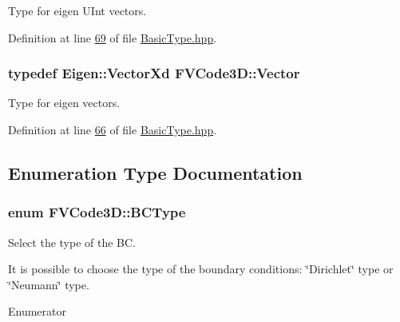 Type for eigen U\+Int vectors. 



Definition at line \hyperlink{BasicType_8hpp_source_l00069}{69} of file \hyperlink{BasicType_8hpp_source}{Basic\+Type.\+hpp}.

\subsubsection[{\texorpdfstring{Vector}{Vector}}]{\setlength{\rightskip}{0pt plus 5cm}typedef Eigen\+::\+Vector\+Xd {\bf F\+V\+Code3\+D\+::\+Vector}}\hypertarget{namespaceFVCode3D_a16ccf345652402bccd1a5d2e6782526c}{}\label{namespaceFVCode3D_a16ccf345652402bccd1a5d2e6782526c}


Type for eigen vectors. 



Definition at line \hyperlink{BasicType_8hpp_source_l00066}{66} of file \hyperlink{BasicType_8hpp_source}{Basic\+Type.\+hpp}.



\subsection{Enumeration Type Documentation}
\subsubsection[{\texorpdfstring{B\+C\+Type}{BCType}}]{\setlength{\rightskip}{0pt plus 5cm}enum {\bf F\+V\+Code3\+D\+::\+B\+C\+Type}}\hypertarget{namespaceFVCode3D_a73660061f11f1671164ce171a053f8c5}{}\label{namespaceFVCode3D_a73660061f11f1671164ce171a053f8c5}


Select the type of the BC. 

It is possible to choose the type of the boundary conditions\+: \char`\"{}\+Dirichlet\char`\"{} type or \char`\"{}\+Neumann\char`\"{} type. \begin{Desc}
\item[Enumerator]\par
\begin{description}
\item[{\em 
Dirichlet\hypertarget{namespaceFVCode3D_a73660061f11f1671164ce171a053f8c5a192024697bdaa4fbbb39b8961b747bce}{}\label{namespaceFVCode3D_a73660061f11f1671164ce171a053f8c5a192024697bdaa4fbbb39b8961b747bce}
}]\item[{\em 
Neumann\hypertarget{namespaceFVCode3D_a73660061f11f1671164ce171a053f8c5a30212425b27314b01b40f4984dbf850a}{}\label{namespaceFVCode3D_a73660061f11f1671164ce171a053f8c5a30212425b27314b01b40f4984dbf850a}
}]\end{description}
\end{Desc}



